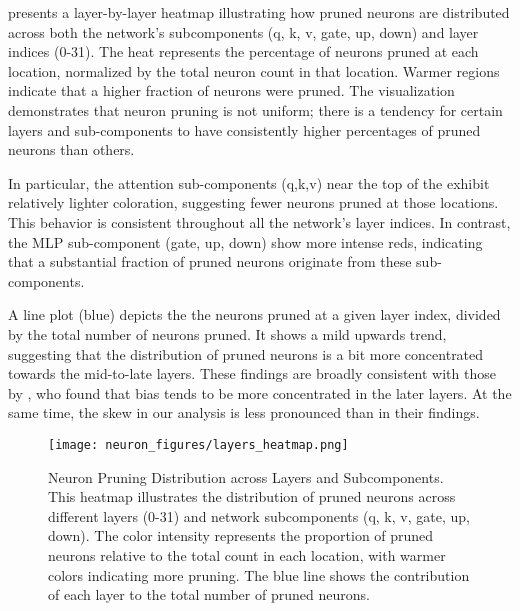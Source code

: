  presents a layer-by-layer heatmap illustrating how pruned neurons are distributed across both the network's subcomponents (q, k, v, gate, up, down) and layer indices (0-31). The heat represents the percentage of neurons pruned at each location, normalized by the total neuron count in that location. Warmer regions indicate that a higher fraction of neurons were pruned. The visualization demonstrates that neuron pruning is not uniform; there is a tendency for certain layers and sub-components to have consistently higher percentages of pruned neurons than others.

In particular, the attention sub-components (q,k,v) near the top of the  exhibit relatively lighter coloration, suggesting fewer neurons pruned at those locations. This behavior is consistent throughout all the network's layer indices. In contrast, the MLP sub-component (gate, up, down) show more intense reds, indicating that a substantial fraction of pruned neurons originate from these sub-components. 

A line plot (blue) depicts the the neurons pruned at a given layer index, divided by the total number of neurons pruned. It shows a mild upwards trend, suggesting that the distribution of pruned neurons is a bit more concentrated towards the mid-to-late layers. These findings are broadly consistent with those by \textcite{adiga2024attention}, who found that bias tends to be more concentrated in the later layers. At the same time, the skew in our analysis is less pronounced than in their findings.


\begin{figure}[t]
  \centering
  \texttt{[image: neuron\_figures/layers\_heatmap.png]}
  \caption{Neuron Pruning Distribution across Layers and Subcomponents. This heatmap illustrates the distribution of pruned neurons across different layers (0-31) and network subcomponents (q, k, v, gate, up, down). The color intensity represents the proportion of pruned neurons relative to the total count in each location, with warmer colors indicating more pruning. The blue line shows the contribution of each layer to the total number of pruned neurons.}

  \label{fig-hm-layers}
\end{figure}